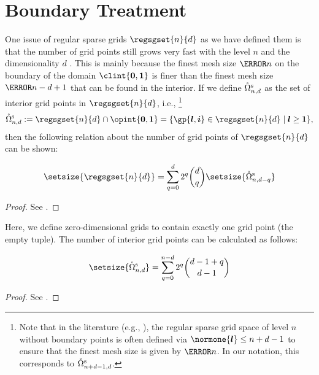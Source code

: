 \section{Boundary Treatment}
\label{sec:24boundary}

One issue of regular sparse grids $\regsgset{n}{d}$ as we have defined them
is that the number of grid points still grows very fast
with the level $n$ and the dimensionality $d$ \cite{Pflueger10Spatially}.
This is mainly because the finest mesh size $\ms{n}$ on the
boundary of the domain $\clint{\*0, \*1}$ is finer than
the finest mesh size $\ms{n-d+1}$ that can be found in the interior.
If we define $\interiorregsgset{n}{d}$ as the set of
interior grid points in $\regsgset{n}{d}$, i.e.,%
\footnote{%
  Note that in the literature (e.g., \cite{Pflueger10Spatially}),
  the regular sparse grid space of level $n$ without boundary points is often
  defined via $\normone{\*l} \le n + d - 1$ to ensure that the finest mesh size
  is given by $\ms{n}$.
  In our notation, this corresponds to $\interiorregsgset{n+d-1}{d}$.%
}
\begin{equation}
  \interiorregsgset{n}{d}
  := \regsgset{n}{d} \cap \opint{\*0, \*1}
  = \{\gp{\*l,\*i} \in \regsgset{n}{d} \mid \*l \ge \*1\},
\end{equation}
then the following relation about the number of grid points
of $\regsgset{n}{d}$ can be shown:
\begin{lemma}
  \label{lemma:numberOfGridPointsBoundary}
  \setlength{\abovedisplayskip}{0pt}
  \begin{equation}
    \setsize{\regsgset{n}{d}}
    = \sum_{q=0}^d 2^q \binom{d}{q} \setsize{\interiorregsgset{n}{d-q}}
  \end{equation}
\end{lemma}
\begin{proof}
  See \cite{Bungartz04Sparse}.
\end{proof}
Here, we define zero-dimensional grids to contain exactly one grid point
(the empty tuple).
The number of interior grid points can be calculated as follows:
\begin{lemma}
  \label{lemma:numberOfGridPointsInterior}
  \setlength{\abovedisplayskip}{0pt}
  \begin{equation}
    \setsize{\interiorregsgset{n}{d}}
    = \sum_{q=0}^{n-d} 2^q \binom{d-1+q}{d-1}
  \end{equation}
\end{lemma}
\begin{proof}
  See \cite{Bungartz04Sparse}.
\end{proof}


